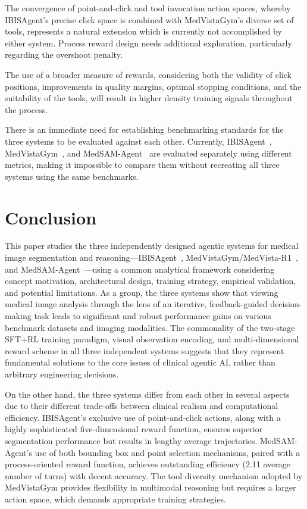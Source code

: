 \documentclass[12pt, a4paper]{article}
\begin{document}
The convergence of point-and-click and tool invocation action spaces, whereby
IBISAgent's precise click space is combined with MedVistaGym's diverse set of tools,
represents a natural extension which is currently not accomplished by either system.
Process reward design needs additional exploration, particularly regarding the
overshoot penalty.

The use of a broader measure of rewards, considering both the validity of click
positions, improvements in quality margins, optimal stopping conditions, and the
suitability of the tools, will result in higher density training signals throughout
the process.

There is an immediate need for establishing benchmarking standards for the three
systems to be evaluated against each other.
Currently, IBISAgent~\cite{ibisagent}, MedVistaGym~\cite{medvistagym}, and
MedSAM-Agent~\cite{medsam_agent} are evaluated separately using different metrics,
making it impossible to compare them without recreating all three systems using the
same benchmarks.

\section{Conclusion}
\label{sec:conclusion}

This paper studies the three independently designed agentic systems for medical image
segmentation and reasoning---IBISAgent~\cite{ibisagent},
MedVistaGym/MedVista-R1~\cite{medvistagym}, and
MedSAM-Agent~\cite{medsam_agent}---using a common analytical framework considering
concept motivation, architectural design, training strategy, empirical validation, and
potential limitations.
As a group, the three systems show that viewing medical image analysis through the lens
of an iterative, feedback-guided decision-making task leads to significant and robust
performance gains on various benchmark datasets and imaging modalities.
The commonality of the two-stage SFT+RL training paradigm, visual observation encoding,
and multi-dimensional reward scheme in all three independent systems suggests that they
represent fundamental solutions to the core issues of clinical agentic AI, rather than
arbitrary engineering decisions.

On the other hand, the three systems differ from each other in several aspects due to
their different trade-offs between clinical realism and computational efficiency.
IBISAgent's exclusive use of point-and-click actions, along with a highly sophisticated
five-dimensional reward function, ensures superior segmentation performance but results
in lengthy average trajectories.
MedSAM-Agent's use of both bounding box and point selection mechanisms, paired with a
process-oriented reward function, achieves outstanding efficiency (2.11 average number
of turns) with decent accuracy.
The tool diversity mechanism adopted by MedVistaGym provides flexibility in multimodal
reasoning but requires a larger action space, which demands appropriate training
strategies.
\end{document}
